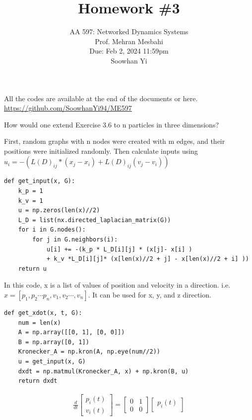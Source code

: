 \documentclass{article}
\begin{document}
\setcounter{problem}{0}
\title{Homework \#3}
\author{
    \normalsize{AA 597: Networked Dynamics Systems}\\
    \normalsize{Prof. Mehran Mesbahi}\\
    \normalsize{Due: Feb 2, 2024 11:59pm}\\
    \normalsize{Soowhan Yi}
}
\date{{}}
\maketitle

All the codes are available at the end of the documents or here.
\url{https://github.com/SoowhanYi94/ME597}
\begin{problem}
    How would one extend Exercise 3.6 to n particles in three dimensions?

    First, random graphs with n nodes were created with m edges, and their positions were initialized randomly.  Then calculate inputs using $u_i = -(L(D)_{ij} * (x_j - x_i) + L(D)_{ij}( v_j - v_i)) $
    \begin{verbatim}
def get_input(x, G):
    k_p = 1
    k_v = 1
    u = np.zeros(len(x)//2)
    L_D = list(nx.directed_laplacian_matrix(G))
    for i in G.nodes():
        for j in G.neighbors(i):
            u[i] += -(k_p * L_D[i][j] * (x[j]- x[i] ) 
            + k_v *L_D[i][j]* (x[len(x)//2 + j] - x[len(x)//2 + i] ))
    return u
    \end{verbatim}
    In this code, x is a list of values of position and velocity in a direction. i.e. $x = [p_1, p_2 \cdots p_n, v_1, v_2 \cdots, v_n]$. It can be used for x, y, and z direction. 
    \begin{verbatim}
def get_xdot(x, t, G):
    num = len(x)
    A = np.array([[0, 1], [0, 0]])
    B = np.array([0, 1])
    Kronecker_A = np.kron(A, np.eye(num//2))
    u = get_input(x, G)
    dxdt = np.matmul(Kronecker_A, x) + np.kron(B, u)
    return dxdt 
    \end{verbatim}
    \begin{align*}
        \frac{d}{dt} 
        \begin{bmatrix*}
            p_i(t)\\
            v_i(t)  
        \end{bmatrix*}
        = \begin{bmatrix*}
            0 & 1\\
            0 & 0 
        \end{bmatrix*}
        \begin{bmatrix*}
            p_i(t)\\

\end{bmatrix*}
\end{align*}
\end{problem}
\end{document}
